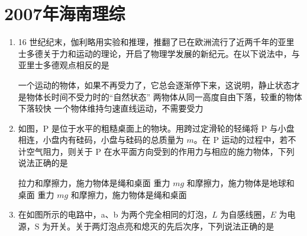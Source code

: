\documentclass[\gkver]{gaokaozhenti}
\begin{document}
\chapter{2007年海南理综}

\begin{enumerate}
\item
16 世纪纪末，伽利略用实验和推理，推翻了已在欧洲流行了近两千年的亚里士多德关于力和运动的理论，开启了物理学发展的新纪元。在以下说法中，与亚里士多德观点相反的是

{一个运动的物体，如果不再受力了，它总会逐渐停下来，这说明，静止状态才是物体长时间不受力时的“自然状态”}
{两物体从同一高度自由下落，较重的物体下落较快}
{一个物体维持匀速直线运动，不需要受力}


\item
如图，P 是位于水平的粗糙桌面上的物块。用跨过定滑轮的轻绳将 P 与小盘相连，小盘内有硅码，小盘与硅码的总质量为 $m$。在 P 运动的过程中，若不计空气阻力，则关于 P 在水平面方向受到的作用力与相应的施力物体，下列说法正确的是

\onepicture[w=5.12cm]{}

{拉力和摩擦力，施力物体是绳和桌面}
{重力 $mg$ 和摩擦力，施力物体是地球和桌面}
{重力 $mg$ 和摩擦力，施力物体是绳和桌面}


\item
在如图所示的电路中，a、b 为两个完全相同的灯泡，$L$ 为自感线圈，$E$ 为电源，S 为开关。关于两灯泡点亮和熄灭的先后次序，下列说法正确的是


\end{enumerate}
\end{document}
